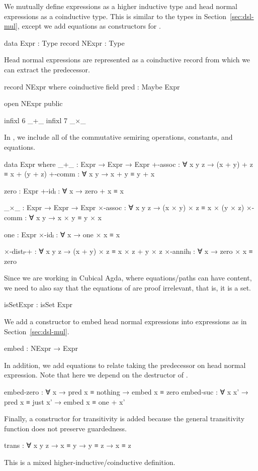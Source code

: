 We mutually define expressions as a higher inductive type and head normal
expressions as a coinductive type. This is similar to the types in
Section~\ref{sec:dsl-mul}, except we add equations as constructors for
.
\begin{AgdaAlign}
\begin{code}
  data Expr : Type
  record NExpr : Type
\end{code}
Head normal expressions are represented as a coinductive record from which we
can extract the predecessor.
\begin{code}
  record NExpr where
    coinductive
    field pred : Maybe Expr
\end{code}
\begin{code}[hide]
  open NExpr public

  infixl 6 _+_
  infixl 7 _×_
\end{code}
In , we include all of the commutative semiring operations,
constants, and equations.
\begin{code}
  data Expr where
    _+_        : Expr → Expr → Expr
    +-assoc    : ∀ x y z → (x + y) + z ≡ x + (y + z)
    +-comm     : ∀ x y → x + y ≡ y + x

    zero       : Expr
    +-idₗ      : ∀ x → zero + x ≡ x

    _×_        : Expr → Expr → Expr
    ×-assoc    : ∀ x y z → (x × y) × z ≡ x × (y × z)
    ×-comm     : ∀ x y → x × y ≡ y × x

    one        : Expr
    ×-idₗ      : ∀ x → one × x ≡ x

    ×-distₗ-+  : ∀ x y z → (x + y) × z ≡ x × z + y × z
    ×-annihₗ   : ∀ x → zero × x ≡ zero
\end{code}
Since we are working in Cubical Agda, where equations/paths can have content, we
need to also say that the equations of  are proof irrelevant,
that is, it is a set.
\begin{code}
    isSetExpr  : isSet Expr
\end{code}
We add a constructor to embed head normal expressions into expressions as in
Section~\ref{sec:dsl-mul}.
\begin{code}
    embed : NExpr → Expr
\end{code}
In addition, we add equations to relate taking the predecessor on head normal
expression. Note that here we depend on the destructor  of
.
\begin{code}
    embed-zero  :
      ∀ x → pred x ≡ nothing → embed x ≡ zero
    embed-suc   :
      ∀ x x' → pred x ≡ just x' → embed x ≡ one + x'
\end{code}
Finally, a constructor for transitivity is added because the general
transitivity function does not preserve guardedness.
\begin{code}
    trans : ∀ {x y z} → x ≡ y → y ≡ z → x ≡ z
\end{code}
\end{AgdaAlign}
This is a mixed higher-inductive/coinductive definition.

